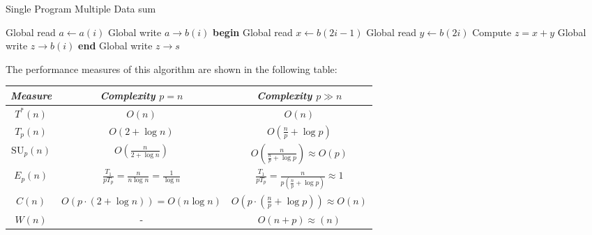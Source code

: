\begin{example}
    \begin{algorithm}[H]
        \caption{Single Program Multiple Data sum}
        \begin{algorithmic}[1]
            \State Global read $a \leftarrow a(i)$
            \State Global write $a \rightarrow b(i)$
                    \State \textbf{begin}
                    \State Global read $x \leftarrow b(2i-1)$
                    \State Global read $y \leftarrow b(2i)$
                    \State Compute $z = x + y$
                    \State Global write $z \rightarrow b(i)$
                    \State \textbf{end}
                \EndIf
            \EndFor
                \State Global write $z \rightarrow s$
            \EndIf
        \end{algorithmic}
    \end{algorithm}
    The performance measures of this algorithm are shown in the following table:
    \renewcommand*{\arraystretch}{2}
    \begin{table}[H]
        \centering
        \begin{tabular}{|c|c|c|}
        \hline
        \textit{Measure} & \textit{Complexity $p=n$} & \textit{Complexity $p\gg n$} \\ \hline
        $T^\ast(n)$ & $O(n)$ & $O(n)$\\ \hline
        $T_p(n)$ & $O\left(2+\log n\right)$ & $O\left(\frac{n}{p}+\log p\right)$\\ \hline
        $\text{SU}_p(n)$ & $O\left(\frac{n}{2+\log n}\right)$ & $O\left(\frac{n}{\frac{n}{p}+\log p}\right)\approx O(p)$ \\ \hline
        $E_p(n)$ & $\frac{T_1}{p T_p} = \frac{n}{n \log n} = \frac{1}{\log n}$ & $\frac{T_1}{p T_p} = \frac{n}{p\left(\frac{n}{p}+\log p\right)} \approx 1$ \\ \hline
        $C(n)$ & $O\left(p \cdot (2+\log n)\right) = O(n\log n)$ & $O\left(p \cdot \left(\frac{n}{p}+\log p\right)\right) \approx O(n)$ \\ \hline
        $W(n)$ & - & $O\left(n+p\right) \approx (n)$ \\ \hline
        \end{tabular}
    \end{table}
    \renewcommand*{\arraystretch}{1}
\end{example}

